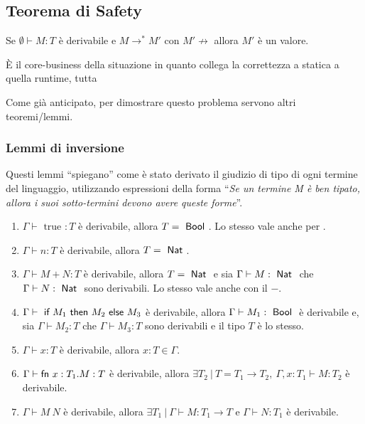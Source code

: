 


\subsection{Teorema di Safety}

\begin{center}
	Se $\emptyset \vdash M : T$ è derivabile e $M \rightarrow^* M'$ con $M' \not\rightarrow$ allora $M'$ è un valore.
\end{center}

\`E il core-business della situazione in quanto collega la correttezza a statica a quella runtime, tutta

Come già anticipato, per dimostrare questo problema servono altri teoremi/lemmi.

\subsubsection{Lemmi di inversione}

Questi lemmi ``spiegano'' come è stato derivato il giudizio di tipo di ogni termine del linguaggio, utilizzando espressioni della forma ``\textit{Se un termine M è ben tipato, allora i suoi sotto-termini devono avere queste forme}''.

\begin{enumerate}
	\item $\Gamma \vdash \text{ true } : T $ è derivabile, allora $T = \Bool $. Lo stesso vale anche per .
	\item $\Gamma \vdash n : T$ è derivabile, allora $T = \Nat$.
	\item $\Gamma \vdash M + N : T$ è derivabile, allora $T = \Nat$ e sia $\Gamma \vdash M : \Nat$ che $\Gamma \vdash N : \Nat$ sono derivabili. Lo stesso vale anche con il $-$.
	\item $\Gamma \vdash \iif M_1 \then M_2 \eelse M_3$ è derivabile, allora $\Gamma \vdash M_1 : \Bool$ è derivabile e, sia $\Gamma \vdash M_2 : T $ che $\Gamma \vdash M_3 :T $ sono derivabili e il tipo $T$ è lo stesso.
	\item $\Gamma \vdash x : T$ è derivabile, allora $x : T \in \Gamma$.
	\item $\Gamma \vdash \fn x : T_1 . M : T$ è derivabile, allora $\exists T_2 \: | \: T = T_1 \rightarrow T_2, \: \Gamma, x:T_1 \vdash M : T_2$ è derivabile.
	\item $\Gamma \vdash M \: N$ è derivabile, allora $ \exists T_1 \: | \: \Gamma \vdash M : T_1 \rightarrow T $ e $\Gamma \vdash N : T_1 $ è derivabile.
\end{enumerate}

